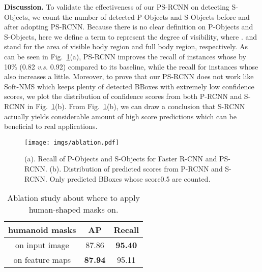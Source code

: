 \documentclass{article}
\begin{document}
\noindent \textbf{Discussion.} To validate the effectiveness of our PS-RCNN on detecting S-Objects, we count the number of detected P-Objects and S-Objects before and after adopting PS-RCNN. Because there is no clear definition on P-Objects and S-Objects, here we define a term  to represent the degree of visibility, where .  and  stand for the area of visible body region and full body region, respectively. As can be seen in Fig.~\ref{fdistinguish}(a), PS-RCNN improves the recall of instances whose  by 10\% (0.82 \emph{v.s.} 0.92) compared to its baseline, while the recall for instances whose  also increases a little. Moreover, to prove that our PS-RCNN does not work like Soft-NMS which keeps plenty of detected BBoxes with extremely low confidence scores, we plot the distribution of confidence scores from both P-RCNN and S-RCNN in Fig.~\ref{fdistinguish}(b). From Fig.~\ref{fdistinguish}(b), we can draw a conclusion that S-RCNN actually yields considerable amount of high score predictions which can be beneficial to real applications.

\begin{figure}[h]
\begin{center}
\texttt{[image: imgs/ablation.pdf]}
\end{center}
\vspace{-0.3cm}
   \caption{(a). Recall of P-Objects and S-Objects for Faster R-CNN and PS-RCNN. (b). Distribution of predicted scores from P-RCNN and S-RCNN. Only predicted BBoxes whose score0.5 are counted.}
   \label{fdistinguish}
   \vspace{-0.3cm}
\end{figure}

\begin{table}[]
\caption{Ablation study about where to apply human-shaped masks on.}
\centering
\begin{tabular}{c|cc}
\hline
humanoid masks  & AP & Recall \\ \hline
on input image & 87.86   & \textbf{95.40}       \\
on feature maps   & \textbf{87.94}   & 95.11       \\ \hline
\end{tabular}\label{fori}
\vspace{-0.3cm}
\end{table}
\end{document}
